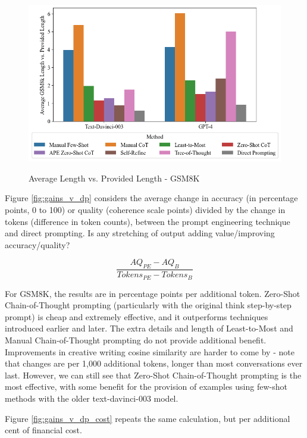 \documentclass[11pt]{article}
\begin{document}
\begin{figure}
  \caption{Average Length vs. Provided Length - GSM8K}
  \centering
  \includegraphics[width=\textwidth]{../Output/gsm8k_length_vs_provided_means.png}
  \label{fig:gsm8k_len_v_prov}
\end{figure}

Figure \ref{fig:gains_v_dp} considers the average change in accuracy (in percentage points, 0 to 100) or quality (coherence scale points) divided by the change in tokens (difference in token counts), between the prompt engineering technique and direct prompting. Is any stretching of output adding value/improving accuracy/quality?

\begin{displaymath}
  \frac{AQ_{PE} - AQ_{B}}{Tokens_{PE} - Tokens_{B}}
\end{displaymath}

For GSM8K, the results are in percentage points per additional token. Zero-Shot Chain-of-Thought prompting (particularly with the original think step-by-step prompt) is cheap and extremely effective, and it outperforms techniques introduced earlier and later. The extra details and length of Least-to-Most and Manual Chain-of-Thought prompting do not provide additional benefit. Improvements in creative writing cosine similarity are harder to come by - note that changes are per 1,000 additional tokens, longer than most conversations ever last. However, we can still see that Zero-Shot Chain-of-Thought prompting is the most effective, with some benefit for the provision of examples using few-shot methods with the older text-davinci-003 model.

Figure \ref{fig:gains_v_dp_cost} repeats the same calculation, but per additional cent of financial cost.
\end{document}
